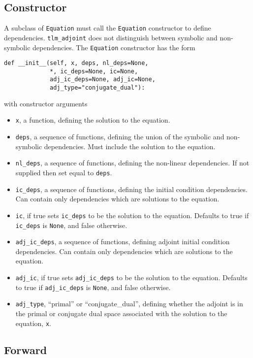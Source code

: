 \documentclass[11pt]{article}
\begin{document}
\subsection{Constructor}

A subclass of \texttt{Equation} must call the \texttt{Equation} constructor to
define dependencies. \texttt{tlm\_adjoint} does not distinguish between
symbolic and non-symbolic dependencies. The \texttt{Equation} constructor has
the form
\begin{lstlisting}
def __init__(self, x, deps, nl_deps=None,
             *, ic_deps=None, ic=None,
             adj_ic_deps=None, adj_ic=None,
             adj_type="conjugate_dual"):
\end{lstlisting}
with constructor arguments
\begin{itemize}
  \item \texttt{x}, a function, defining the solution to the equation.
  \item \texttt{deps}, a sequence of functions, defining the union of the
    symbolic and non-symbolic dependencies. Must include the solution to the
    equation.
  \item \texttt{nl\_deps}, a sequence of functions, defining the non-linear
    dependencies. If not supplied then set equal to \texttt{deps}.
  \item \texttt{ic\_deps}, a sequence of functions, defining the initial
    condition dependencies. Can contain only dependencies which are solutions
    to the equation.
  \item \texttt{ic}, if true sets \texttt{ic\_deps} to be the solution to the
    equation. Defaults to true if \texttt{ic\_deps} is \texttt{None}, and false
    otherwise.
  \item \texttt{adj\_ic\_deps}, a sequence of functions, defining adjoint
    initial condition dependencies. Can contain only dependencies which are
    solutions to the equation.
  \item \texttt{adj\_ic}, if true sets \texttt{adj\_ic\_deps} to be the
    solution to the equation. Defaults to true if \texttt{adj\_ic\_deps} is
    \texttt{None}, and false otherwise.
  \item \texttt{adj\_type}, ``primal'' or ``conjugate\_dual'', defining whether
    the adjoint is in the primal or conjugate dual space associated with the
    solution to the equation, \texttt{x}.
\end{itemize}

\subsection{Forward}
\end{document}
